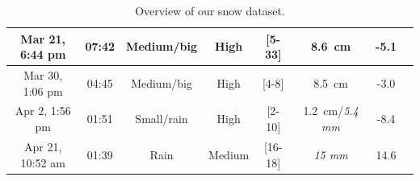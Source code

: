 \begin{table}[htbp]
\begin{tabular}{|c|c|c|c|c|c|c|c|}
        Mar 21, 6:44 pm    &  07:42            & Medium/big          & High             & [5-33]                         & \SI{8.6}{\cm}                 & -5.1  \\\hline
        Mar 30, 1:06 pm    &  04:45            & Medium/big          & High             & [4-8]                          & \SI{8.5}{\cm}                 & -3.0  \\\hline
        Apr 2, 1:56 pm     &  01:51            & Small/rain          & High             & [2-10]                         & \SI{1.2}{\cm}/\textit{5.4 mm} & -8.4  \\\hline
        Apr 21, 10:52 am   &  01:39            & Rain                & Medium           & [16-18]                        & \textit{15 mm}                & 14.6  \\\hline
    \end{tabular}
    \caption{Overview of our snow dataset.}
    \label{tab:overview-dataset}
\end{table}

